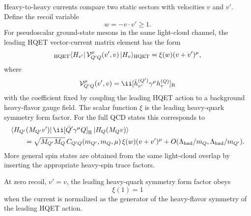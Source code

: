 Heavy-to-heavy currents compare two static sectors with velocities \(v\) and
\(v'\).  Define the recoil variable
\begin{equation}
  w=-v\cdot v'\ge1 .
  \label{eq:hqet-recoil-variable}
\end{equation}
For pseudoscalar ground-state mesons in the same light-cloud channel, the
leading HQET vector-current matrix element has the form
\begin{equation}
  {}_{\rm HQET}\langle H_{v'}|\,
  \mathcal V_{Q'Q}^\mu(v',v)\,|H_v\rangle_{\rm HQET}
  =
  \xi(w)(v+v')^\mu ,
  \label{eq:hqet-isgur-wise-definition}
\end{equation}
where
\[
  \mathcal V_{Q'Q}^\mu(v',v)
  =
  \ii[\bar h_{v'}^{(Q')}\gamma^\mu h_v^{(Q)}]_{\rm R}
\]
with the coefficient fixed by coupling the leading HQET action to a background
heavy-flavor gauge field.  The scalar function \(\xi\) is the leading
heavy-quark symmetry form factor.  For the full QCD states this corresponds to
\begin{equation}
  \begin{aligned}
  &\langle H_{Q'}(M_{Q'}v')|\,\ii[\bar Q'\gamma^\mu Q]_{\rm R}\,
  |H_Q(M_Qv)\rangle
  \\
  &\qquad =
  \sqrt{M_{Q'}M_Q}\,
  C_{Q'Q}(m_{Q'},m_Q,\mu)\,
  \xi(w)(v+v')^\mu
  +O(\Lambda_{\rm had}/m_Q,\Lambda_{\rm had}/m_{Q'}).
  \end{aligned}
  \label{eq:hqet-heavy-to-heavy-qcd-form-factor}
\end{equation}
More general spin states are obtained from the same light-cloud overlap by
inserting the appropriate heavy-spin trace factors.

\begin{lemma}
\label{lem:hqet-isgur-wise-normalization}
At zero recoil, \(v'=v\), the leading heavy-quark symmetry form factor obeys
\begin{equation}
  \xi(1)=1
  \label{eq:hqet-isgur-wise-normalization}
\end{equation}
when the current is normalized as the generator of the heavy-flavor symmetry
of the leading HQET action.
\end{lemma}

